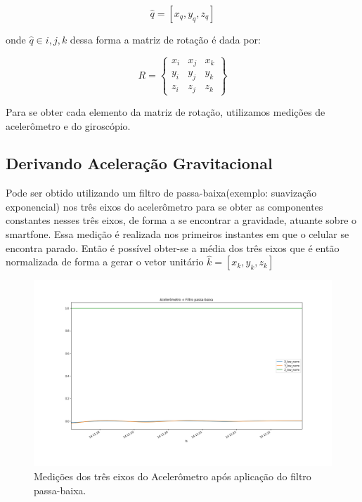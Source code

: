\begin{equation}
    \hat{q} = [x_q,y_q,z_q]
\end{equation}{}

onde $\hat{q} \in i,j,k$  dessa forma a matriz de rotação é dada por:

\begin{equation}
    R = \begin{Bmatrix}
x_i &x_j  &x_k \\ 
y_i &y_j  &y_k \\ 
z_i &z_j  &z_k 
\end{Bmatrix}
\end{equation}{}

Para se obter cada elemento da matriz de rotação, utilizamos medições de acelerômetro e do giroscópio.

\subsection{Derivando Aceleração Gravitacional} 
Pode ser obtido utilizando um filtro de passa-baixa(exemplo: suavização exponencial) nos três eixos do acelerômetro para se obter as componentes constantes nesses três eixos, de forma a se encontrar a gravidade, atuante sobre o smartfone. Essa medição é realizada nos primeiros instantes em que o celular se encontra parado. Então é possível obter-se a média dos três eixos que é então normalizada de forma a gerar o vetor unitário $\hat{k} = [x_k,y_k,z_k]$  

\begin{figure}
    \centering
    \includegraphics[width=150mm]{Figuras/acelerometroPassaBaixa.png}
    \caption{Medições dos três eixos do Acelerômetro após aplicação do filtro passa-baixa. }
    \label{fig:acelerometroPassaBaixa}
\end{figure}


